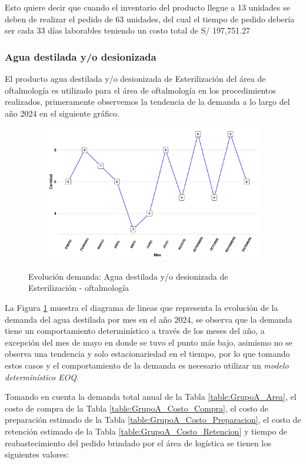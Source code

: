 Esto quiere decir que cuando el inventario del producto llegue a 13 unidades se deben de realizar el pedido de 63 unidades, del cual el tiempo de pedido debería ser cada 33 días laborables teniendo un costo total de S/ 197,751.27

\subsubsection{Agua destilada y/o desionizada}

El producto agua destilada y/o desionizada de Esterilización del área de oftalmología es utilizado para el área de oftalmología en los procedimientos realizados, primeramente observemos la tendencia de la demanda a lo largo del año 2024 en el siguiente gráfico.
\clearpage
\begin{figure}[H]
  \caption{Evolución demanda: Agua destilada y/o desionizada de Esterilización - oftalmología}
  {\includegraphics[width=15cm, height=5.95cm]{images/PROD018_demanda.pdf}}
  \label{fig:PROD018_demanda}
\end{figure}

La Figura \ref{fig:PROD018_demanda} muestra el diagrama de lineas que representa la evolución de la demanda del agua destilada por mes en el año 2024, se observa que la demanda tiene un comportamiento determinístico a través de los meses del año, a excepción del mes de mayo en donde se tuvo el punto más bajo, asimismo no se observa una tendencia y solo estacionariedad en el tiempo, por lo que tomando estos casos y el comportamiento de la demanda es necesario utilizar un \textsl{modelo determinístico EOQ}.

Tomando en cuenta la demanda total anual de la Tabla \ref{table:GrupoA_Area}, el costo de compra de la Tabla \ref{table:GrupoA_Costo_Compra}, el costo de preparación estimado de la Tabla \ref{table:GrupoA_Costo_Preparacion}, el costo de retención estimado de la Tabla \ref{table:GrupoA_Costo_Retencion} y tiempo de reabastecimiento del pedido brindado por el área de logística se tienen los siguientes valores:

